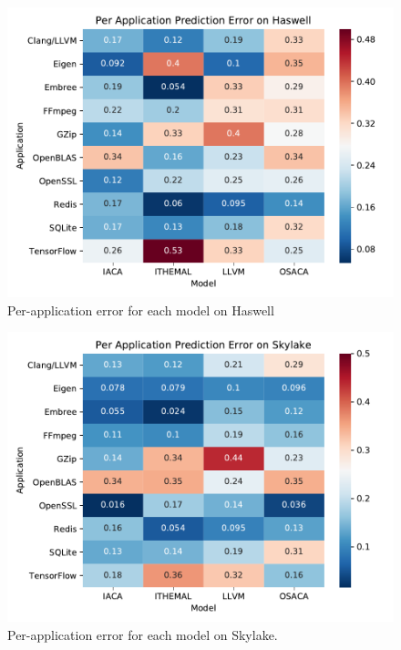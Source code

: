 \begin{figure}
\includegraphics[width=\columnwidth]{figures/hsw-app-err.pdf}
\caption{Per-application error for each model on Haswell}
\label{fig:hsw-app-err}
\end{figure}

\begin{figure}
\includegraphics[width=\columnwidth]{figures/skl-app-err.pdf}
\caption{Per-application error for each model on Skylake. }
\label{fig:skl-app-err}
\end{figure}

